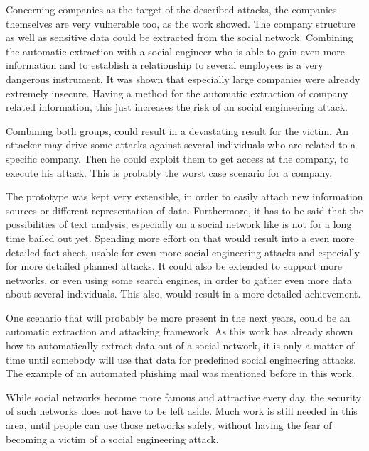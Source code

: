 Concerning companies as the target of the described attacks, the companies
themselves are very vulnerable too, as the work showed. The company
structure as well as sensitive data could be extracted from the social network.
Combining the automatic extraction with a social engineer who is able to gain
even more information and to establish a relationship to several employees is a
very dangerous instrument. It was shown that especially large companies were
already extremely insecure. Having a method for the automatic extraction of
company related information, this just increases the risk of an social
engineering attack.

Combining both groups, could result in a devastating result for the victim. An
attacker may drive some attacks against several individuals who are related to a
specific company. Then he could exploit them to get access at the company, to
execute his attack. This is probably the worst case scenario for a company.

The prototype was kept very extensible, in order to easily attach new
information sources or different representation of data. Furthermore, it has to
be said that the possibilities of text analysis, especially on a social
network like \Twitter{} is not for a long time bailed out yet. Spending more
effort on that would result into a even more detailed fact sheet, usable for
even more social engineering attacks and especially for more detailed planned
attacks. It could also be extended to support more networks, or even using
some search engines, in order to gather even more data about several
individuals. This also, would result in a more detailed achievement.

One scenario that will probably be more present in the next years, could be an
automatic extraction and attacking framework. As this work has already shown
how to automatically extract data out of a social network, it is only a matter
of time until somebody will use that data for predefined social engineering
attacks. The example of an automated phishing mail was mentioned before in this
work.

While social networks become more famous and attractive every day, the security
of such networks does not have to be left aside. Much work is still needed in
this area, until people can use those networks safely, without having the fear
of becoming a victim of a social engineering attack.
